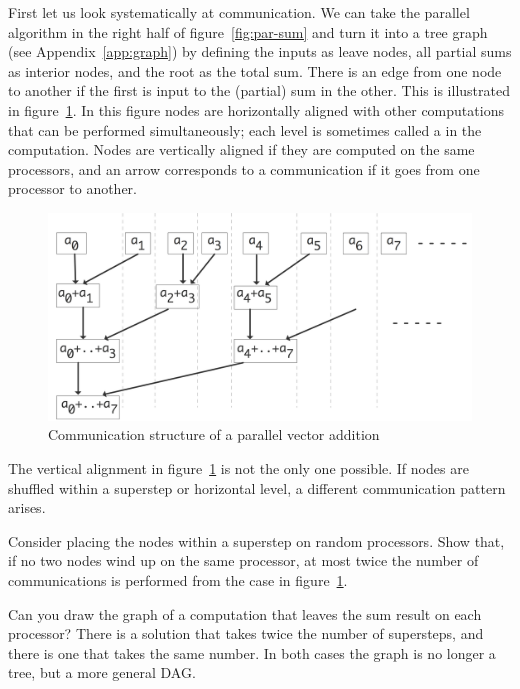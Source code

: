 First let us look systematically at communication. We can take the
parallel algorithm in the right half
of figure~\ref{fig:par-sum} and turn it into a tree graph
(see Appendix~\ref{app:graph}) by defining the inputs as leave nodes,
all partial sums as interior nodes, and the root as the total
sum. There is an edge from one node to another if the first is input
to the (partial) sum in the other. This is illustrated in
figure~\ref{fig:par-sum-graph}. In this figure nodes are horizontally
aligned with other computations that can be performed simultaneously;
each level is sometimes called a  in the computation.
Nodes are vertically aligned if they are computed on the same
processors, and an arrow corresponds to a communication if it goes
from one processor to another. 
\begin{figure}[ht]
  \includegraphics[scale=.13]{graphics/parallel-sum-graph}
  \caption{Communication structure of a parallel vector addition}
  \label{fig:par-sum-graph}
\end{figure}
The vertical alignment in figure~\ref{fig:par-sum-graph} is not the
only one possible. If nodes are shuffled within a superstep or
horizontal level, a different communication pattern arises.
\begin{exercise}
  Consider placing the nodes within a superstep on random
  processors. Show that, if no two nodes wind up on the same
  processor, at most twice the number of communications is performed
  from the case in figure~\ref{fig:par-sum-graph}.
\end{exercise}

\begin{exercise}
  Can you draw the graph of a computation that leaves the sum result
  on each processor? There is a solution that takes twice the number
  of supersteps, and there is one that takes the same number. In both
  cases the graph is no longer a tree, but a more general \ac{DAG}.
\end{exercise}

